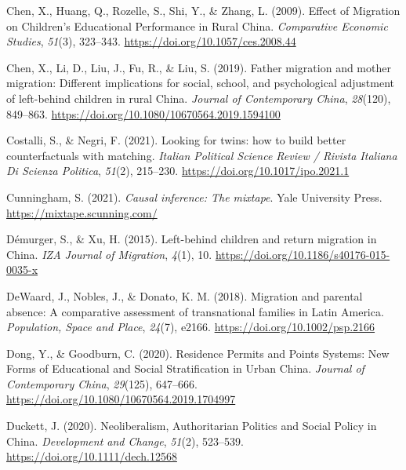 \documentclass[
  man,floatsintext]{apa7}
\newlength{\cslhangindent}
\newlength{\cslentryspacingunit} %
\newenvironment{CSLReferences}[2] %
 {%
  \setlength{\parindent}{0pt}
  \ifodd #1
  \let\oldpar\par
  \def\par{\hangindent=\cslhangindent\oldpar}
  \fi
  \setlength{\parskip}{#2\cslentryspacingunit}
 }%
 {}
\begin{document}
\begin{CSLReferences}{1}{0}
\leavevmode{}%
Chen, X., Huang, Q., Rozelle, S., Shi, Y., \& Zhang, L. (2009). Effect of Migration on Children's Educational Performance in Rural {China}. \emph{Comparative Economic Studies}, \emph{51}(3), 323--343. \url{https://doi.org/10.1057/ces.2008.44}

\leavevmode{}%
Chen, X., Li, D., Liu, J., Fu, R., \& Liu, S. (2019). Father migration and mother migration: Different implications for social, school, and psychological adjustment of left-behind children in rural {China}. \emph{Journal of Contemporary {China}}, \emph{28}(120), 849--863. \url{https://doi.org/10.1080/10670564.2019.1594100}

\leavevmode{}%
Costalli, S., \& Negri, F. (2021). Looking for twins: how to build better counterfactuals with matching. \emph{Italian Political Science Review / Rivista Italiana Di Scienza Politica}, \emph{51}(2), 215--230. \url{https://doi.org/10.1017/ipo.2021.1}

\leavevmode{}%
Cunningham, S. (2021). \emph{Causal inference: The mixtape}. Yale University Press. \url{https://mixtape.scunning.com/}

\leavevmode{}%
Démurger, S., \& Xu, H. (2015). Left-behind children and return migration in {China}. \emph{IZA Journal of Migration}, \emph{4}(1), 10. \url{https://doi.org/10.1186/s40176-015-0035-x}

\leavevmode{}%
DeWaard, J., Nobles, J., \& Donato, K. M. (2018). Migration and parental absence: A comparative assessment of transnational families in Latin America. \emph{Population, Space and Place}, \emph{24}(7), e2166. \url{https://doi.org/10.1002/psp.2166}

\leavevmode{}%
Dong, Y., \& Goodburn, C. (2020). Residence Permits and Points Systems: New Forms of Educational and Social Stratification in Urban {China}. \emph{Journal of Contemporary {China}}, \emph{29}(125), 647--666. \url{https://doi.org/10.1080/10670564.2019.1704997}

\leavevmode{}%
Duckett, J. (2020). Neoliberalism, Authoritarian Politics and Social Policy in {China}. \emph{Development and Change}, \emph{51}(2), 523--539. \url{https://doi.org/10.1111/dech.12568}


\end{CSLReferences}
\end{document}

